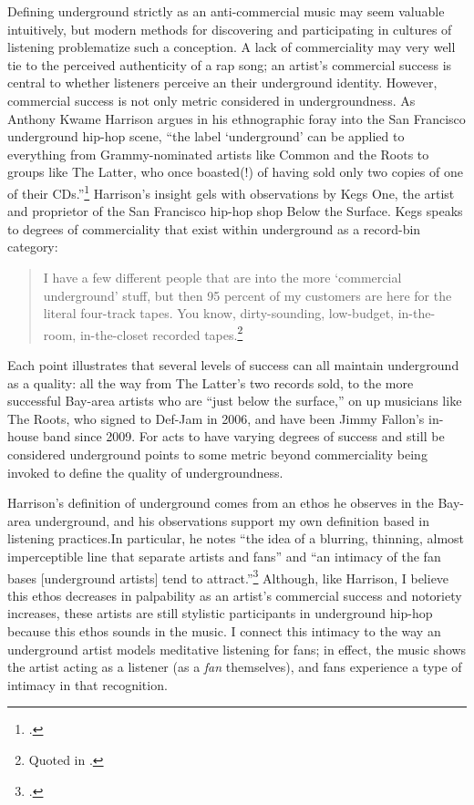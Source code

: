 Defining underground strictly as an anti-commercial music may seem valuable intuitively, but 
modern methods for discovering and participating in cultures of listening problematize such a
conception. A lack of commerciality may very well tie to the perceived authenticity of a rap
song; an artist's commercial success is central to whether listeners perceive an their underground
identity. However, commercial success is not only metric considered in undergroundness. As Anthony
Kwame Harrison argues in his ethnographic foray into the San Francisco underground hip-hop scene, 
``the label `underground' can be applied to everything from Grammy-nominated artists like Common 
and the Roots to groups like The Latter, who once boasted(!) of having sold only two copies of one
of their CDs.''\footnote{
    \autocite[9]{anthonykwameharrisonHipHopUnderground2009}.}
Harrison's insight gels with observations by Kegs One, the artist and proprietor of the San 
Francisco hip-hop shop Below the Surface. Kegs speaks to degrees of commerciality that exist
within underground as a record-bin category:
    \begin{quote}
        \small I have a few different people that are into the more `commercial underground' stuff, 
        but then 95 percent of my customers are here for the  literal four-track tapes. You 
        know,  dirty-sounding, low-budget, in-the-room, in-the-closet recorded 
        tapes.\footnote{
            Quoted in \autocite[10]{anthonykwameharrisonHipHopUnderground2009}.}
    \end{quote}
Each point illustrates that several levels of success can all maintain underground as a quality:
all the way from The Latter's two records sold, to the more successful Bay-area artists who are
``just below the surface,'' on up musicians like The Roots, who signed to Def-Jam in 2006, and 
have been Jimmy Fallon's in-house band since 2009. For acts to have varying degrees of success 
and still be considered underground points to some metric beyond commerciality being invoked to 
define the quality of undergroundness.

Harrison's definition of underground comes from an ethos he observes in the Bay-area underground,
and his observations support my own definition based in listening practices.In particular, he notes
``the idea of a blurring, thinning, almost imperceptible line that separate artists and fans'' and
``an intimacy of the fan bases [underground artists] tend to attract.''\footnote{
    \autocite[10--11]{anthonykwameharrisonHipHopUnderground2009}.}
Although, like Harrison, I believe this ethos decreases in palpability as an artist's commercial 
success and notoriety increases, these artists are still stylistic participants in underground 
hip-hop because this ethos sounds in the music. I connect this intimacy to the way an underground
artist models meditative listening for fans; in effect, the music shows the artist acting as a 
listener (as a \emph{fan} themselves), and fans experience a type of intimacy in that recognition.

